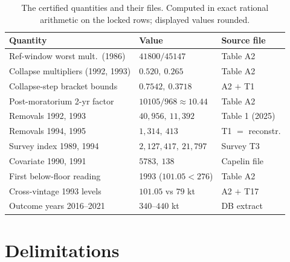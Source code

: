 \begin{table}[t]
\centering
\scriptsize
\setlength{\tabcolsep}{2.8pt}
\caption{The certified quantities and their files. Computed in exact
rational arithmetic on the locked rows; displayed values rounded.}
\label{regime-tab:summary}
\begin{tabular}{@{}l l l@{}}
\toprule
Quantity & Value & Source file \\
\midrule
Ref-window worst mult.\ (1986) & \(41800/45147\) & Table A2 \\
Collapse multipliers (1992, 1993) & \(0.520,\ 0.265\) & Table A2 \\
Collapse-step bracket bounds & \(0.7542,\ 0.3718\) & A2 $+$ T1 \\
Post-moratorium 2-yr factor & \(10105/968 \approx 10.44\) & Table A2 \\
Removals 1992, 1993 & \(40{,}956,\ 11{,}392\) & Table 1 (2025) \\
Removals 1994, 1995 & \(1{,}314,\ 413\) & T1 $=$ reconstr. \\
Survey index 1989, 1994 & \(2{,}127{,}417,\ 21{,}797\) & Survey T3 \\
Covariate 1990, 1991 & \(5783,\ 138\) & Capelin file \\
First below-floor reading & 1993 (\(101.05 < 276\)) & Table A2 \\
Cross-vintage 1993 levels & \(101.05\) vs \(79\) kt & A2 $+$ T17 \\
Outcome years 2016--2021 & \(340\)--\(440\) kt & DB extract \\
\bottomrule
\end{tabular}
\end{table}

\section{Delimitations}\label{regime-scope}

